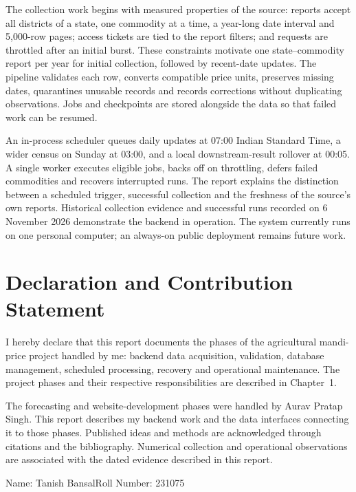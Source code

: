 \documentclass[12pt,a4paper,oneside]{report}
\newcommand{\studentname}{Tanish Bansal}
\newcommand{\auravname}{Aurav Pratap Singh}
\newcommand{\rollnumber}{231075}
\numberwithin{equation}{chapter}
\numberwithin{figure}{chapter}
\numberwithin{table}{chapter}
\theoremstyle{definition}
\begin{document}
The collection work begins with measured properties of the source: reports accept all districts of a state, one commodity at a time, a year-long date interval and 5,000-row pages; access tickets are tied to the report filters; and requests are throttled after an initial burst. These constraints motivate one state--commodity report per year for initial collection, followed by recent-date updates. The pipeline validates each row, converts compatible price units, preserves missing dates, quarantines unusable records and records corrections without duplicating observations. Jobs and checkpoints are stored alongside the data so that failed work can be resumed.

An in-process scheduler queues daily updates at 07:00 Indian Standard Time, a wider census on Sunday at 03:00, and a local downstream-result rollover at 00:05. A single worker executes eligible jobs, backs off on throttling, defers failed commodities and recovers interrupted runs. The report explains the distinction between a scheduled trigger, successful collection and the freshness of the source's own reports. Historical collection evidence and successful runs recorded on 6 November 2026 demonstrate the backend in operation. The system currently runs on one personal computer; an always-on public deployment remains future work.

\clearpage
\chapter*{Declaration and Contribution Statement}
I hereby declare that this report documents the phases of the agricultural mandi-price project handled by me: backend data acquisition, validation, database management, scheduled processing, recovery and operational maintenance. The project phases and their respective responsibilities are described in Chapter~1.

The forecasting and website-development phases were handled by \auravname. This report describes my backend work and the data interfaces connecting it to those phases. Published ideas and methods are acknowledged through citations and the bibliography. Numerical collection and operational observations are associated with the dated evidence described in this report.

\vspace{1.2cm}
\noindent Name: \studentname \hfill Roll Number: \rollnumber
\vspace{1.0cm}
\end{document}
